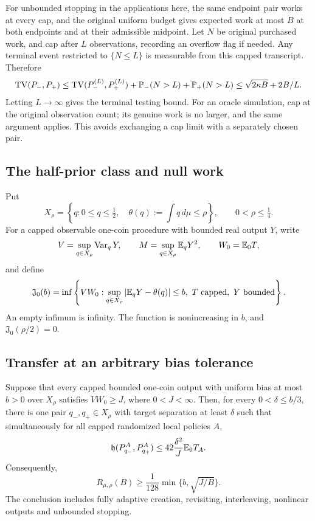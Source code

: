 For unbounded stopping in the applications here, the same endpoint pair
works at every cap, and the original uniform budget gives expected work
at most $B$ at both endpoints and at their admissible midpoint. Let $N$
be original purchased work, and cap after $L$ observations, recording an
overflow flag if needed. Any terminal event restricted to $\{N\le L\}$
is measurable from this capped transcript. Therefore
\[
 \operatorname{TV}(P_-,P_+)
 \le\operatorname{TV}(P_-^{(L)},P_+^{(L)})
       +\mathbb P_-(N>L)+\mathbb P_+(N>L)
 \le\sqrt{2\kappa B}+2B/L.
\]
Letting $L\to\infty$ gives the terminal testing bound. For an oracle
simulation, cap at the original observation count; its genuine work
is no larger, and the same argument applies. This avoids exchanging a
cap limit with a separately chosen pair.

\subsection{The half-prior class and null work}

Put
\[
 X_\rho=\left\{q:0\le q\le\tfrac12,\quad
                  \theta(q):=\int q\,d\mu\le\rho\right\},
 \qquad 0<\rho\le\tfrac14.
\]
For a capped observable one-coin procedure with bounded real output \(Y\),
write
\[
 V=\sup_{q\in X_\rho}\operatorname{Var}_qY,\qquad
 M=\sup_{q\in X_\rho}\mathbb E_qY^2,\qquad W_0=\mathbb E_0T,
\]
and define
\begin{equation}
 \mathfrak J_0(b)=\inf\left\{VW_0:
       \sup_{q\in X_\rho}|\mathbb E_qY-\theta(q)|\le b,
       \ T\text{ capped},\ Y\text{ bounded}\right\}.
 \label{eq:null-bias-complexity}
\end{equation}
An empty infimum is infinity.  The function is nonincreasing in \(b\),
and \(\mathfrak J_0(\rho/2)=0\).

\subsection{Transfer at an arbitrary bias tolerance}

\begin{theorem}
\label{thm:bias-transfer}
Suppose that every capped bounded one-coin output with uniform bias at
most \(b>0\) over \(X_\rho\) satisfies \(VW_0\ge J\), where
\(0<J<\infty\).  Then, for every \(0<\delta\le b/3\), there is one pair
\(q_-,q_+\in X_\rho\) with target separation at least \(\delta\) such
that simultaneously for all capped randomized local policies \(A\),
\begin{equation}
 \mathfrak h(P_{q_-}^A,P_{q_+}^A)
 \le42\frac{\delta^2}{J}\mathbb E_0T_A.
 \label{eq:bias-common-pair}
\end{equation}
Consequently,
\begin{equation}
 R_{\mu,\rho}(B)\ge\frac1{128}
                 \min\{b,\sqrt{J/B}\}.
 \label{eq:bias-population-transfer}
\end{equation}
The conclusion includes fully adaptive creation, revisiting, interleaving,
nonlinear outputs and unbounded stopping.
\end{theorem}

